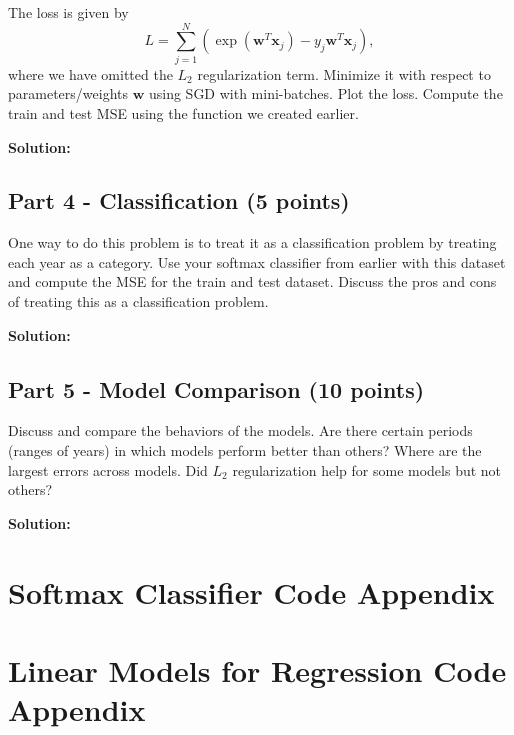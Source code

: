 \documentclass[11pt, oneside]{article}   	%
\begin{document}
The loss is given by 
\[L = \sum\limits_{j = 1}^N {\left( {\exp \left( {{{\mathbf{w}}^T}{{\mathbf{x}}_j}} \right) - {y_j}{{\mathbf{w}}^T}{{\mathbf{x}}_j}} \right)} , \]
where we have omitted the $L_2$ regularization term. Minimize it with respect to parameters/weights $\mathbf{w}$ using SGD with mini-batches. Plot the loss. Compute the train and test MSE using the function we created earlier.


\textbf{Solution:}\\



\subsection*{Part 4 - Classification (5 points)}
One way to do this problem is to treat it as a classification problem by treating each year as a category. Use your softmax classifier from earlier with this dataset and compute the MSE for the train and test dataset. Discuss the pros and cons of treating this as a classification problem.


\textbf{Solution:}\\


\subsection*{Part 5 - Model Comparison (10 points)}

Discuss and compare the behaviors of the models. Are there certain periods (ranges of years) in which models perform better than others? Where are the largest errors across models. Did $L_2$ regularization help for some models but not others?


\textbf{Solution:}\\



\section*{Softmax Classifier Code Appendix}


\section*{Linear Models for Regression Code Appendix}
\end{document}
